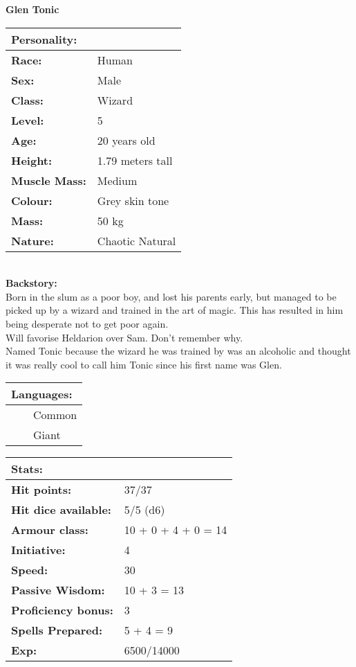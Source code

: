 \documentclass[11pt]{article}
\newcommand{\tabitem}{~~\llap{--}~~}
\begin{document}
	\begin{center}
\Huge \textbf{Glen Tonic}
	\end{center}
	\begin{multicols}{2}
\noindent \begin{tabularx}{95mm}{@{}l l}
\Large \textbf{Personality:} 	& 					\\
\hline
\textbf{Race:} 					& Human 			\\
\textbf{Sex:} 					& Male 				\\
\textbf{Class:}					& Wizard			\\
\textbf{Level:} 				& 5 	 			\\
\textbf{Age:} 					& 20 years old 		\\
\textbf{Height:} 				& 1.79 meters tall 	\\
\textbf{Muscle Mass:} 			& Medium 			\\
\textbf{Colour:} 				& Grey skin tone 	\\
\textbf{Mass:} 					& 50 kg 			\\
\textbf{Nature:} 				& Chaotic Natural
		\end{tabularx} \\
\textbf{Backstory:} \\
Born in the slum as a poor boy, and lost his parents early, but managed to be picked up by a wizard and trained in the art of magic. This has resulted in him being desperate not to get poor again. \\
Will favorise Heldarion over Sam. Don't remember why. \\
Named Tonic because the wizard he was trained by was an alcoholic and thought it was really cool to call him Tonic since his first name was Glen. \\

\noindent \begin{tabularx}{95mm}{@{}l}
{\Large \textbf{Languages:}} \\
\hline
\tabitem Common \\
\tabitem Giant
		\end{tabularx}
		
\vspace{4mm}
		
\noindent \begin{tabularx}{95mm}{@{}l l}
\Large \textbf{Stats:}		 	& 							\\
\hline
\textbf{Hit points:} 			& 37/37					 	\\
\textbf{Hit dice available:}	& 5/5 (d6)						\\
\textbf{Armour class:} 			& 10 + 0 + 4 + 0 = 14 		\\
\textbf{Initiative:} 			& 4	 						\\
\textbf{Speed:} 				& 30		 				\\
\textbf{Passive Wisdom:} 		& 10 + 3 = 13	 			\\
\textbf{Proficiency bonus:}		& 3							\\
\textbf{Spells Prepared:} 		& 5 + 4 = 9		 			\\
\textbf{Exp:} 					& 6500/14000
		\end{tabularx}
		

\end{multicols}
\end{document}
